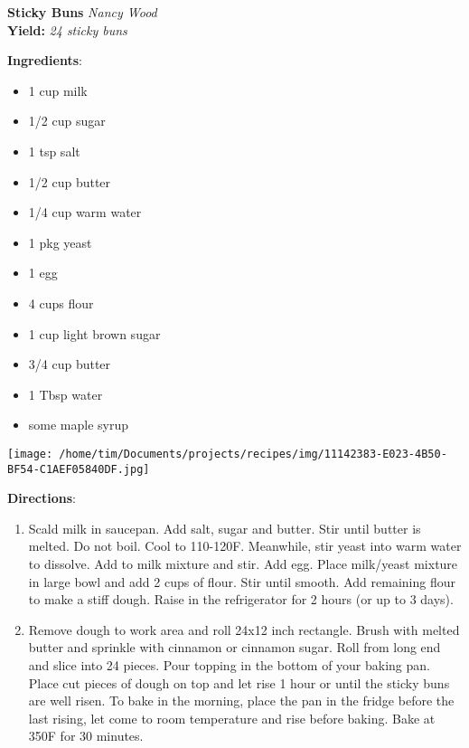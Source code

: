 \documentclass[11pt, twoside, openany]{book}
\begin{document}
\noindent\begin{minipage}[t]{\linewidth}%
{\Large\textbf{Sticky Buns}} \label{sticky-buns}\hfill\textit{Nancy Wood}\\
\textbf{Yield:} \textit{24 sticky buns}\\
\noindent\begin{minipage}[t]{0.78\linewidth}%
\textbf{Ingredients}:\vspace{-3mm}
\begin{multicols}{2}
\begin{itemize}\setlength\itemsep{-1mm}
\item 1 cup milk
\item 1/2 cup sugar
\item 1 tsp salt
\item 1/2 cup butter
\item 1/4 cup warm water
\item 1 pkg yeast
\item 1 egg
\item 4 cups flour
\item 1 cup light brown sugar
\item 3/4 cup butter
\item 1 Tbsp water
\item some maple syrup
\end{itemize}
\end{multicols}
\end{minipage}
\noindent\begin{minipage}[t]{0.18\linewidth}
\centering \strut\vspace*{-\baselineskip}\newline
\texttt{[image: /home/tim/Documents/projects/recipes/img/11142383-E023-4B50-BF54-C1AEF05840DF.jpg]}\\
\end{minipage}\vspace{3mm}
\textbf{Directions}:
\vspace{-3mm}\begin{enumerate}\setlength\itemsep{-1mm}
\item Scald milk in saucepan. Add salt, sugar and butter. Stir until butter is melted. Do not boil. Cool to 110-120F. Meanwhile, stir yeast into warm water to dissolve. Add to milk mixture and stir. Add egg. Place milk/yeast mixture in large bowl and add 2 cups of flour. Stir until smooth. Add remaining flour to make a stiff dough. Raise in the refrigerator for 2 hours (or up to 3 days).
\item Remove dough to work area and roll 24x12 inch rectangle. Brush with melted butter and sprinkle with cinnamon or cinnamon sugar. Roll from long end and slice into 24 pieces. Pour topping in the bottom of your baking pan. Place cut pieces of dough on top and let rise 1 hour or until the sticky buns are well risen. To bake in the morning, place the pan in the fridge before the last rising, let come to room temperature and rise before baking. Bake at 350F for 30 minutes.
\end{enumerate}
\end{minipage}\vspace{8mm}
\end{document}
